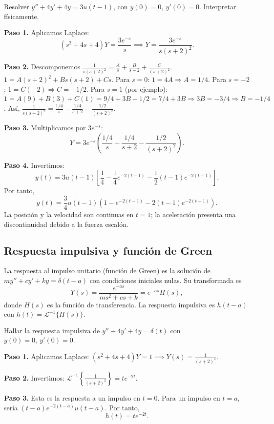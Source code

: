 \begin{example}
Resolver $y'' + 4y' + 4y = 3u(t-1)$, con $y(0)=0,\ y'(0)=0$. Interpretar físicamente.
\begin{myproof}
\textbf{Paso 1.} Aplicamos Laplace:
\[
(s^2+4s+4)Y = \frac{3e^{-s}}{s} \implies Y = \frac{3e^{-s}}{s(s+2)^2}.
\]

\textbf{Paso 2.} Descomponemos $\frac{1}{s(s+2)^2} = \frac{A}{s} + \frac{B}{s+2} + \frac{C}{(s+2)^2}$.
$1 = A(s+2)^2 + B s(s+2) + C s$.
Para $s=0$: $1 = 4A \Rightarrow A=1/4$.
Para $s=-2$: $1 = C(-2) \Rightarrow C=-1/2$.
Para $s=1$ (por ejemplo): $1 = A(9) + B(3) + C(1) = 9/4 + 3B - 1/2 = 7/4 + 3B \Rightarrow 3B = -3/4 \Rightarrow B=-1/4$.
Así, $\frac{1}{s(s+2)^2} = \frac{1/4}{s} - \frac{1/4}{s+2} - \frac{1/2}{(s+2)^2}$.

\textbf{Paso 3.} Multiplicamos por $3e^{-s}$:
\[
Y = 3e^{-s}\left( \frac{1/4}{s} - \frac{1/4}{s+2} - \frac{1/2}{(s+2)^2} \right).
\]

\textbf{Paso 4.} Invertimos:
\[
y(t) = 3u(t-1)\left[ \frac{1}{4} - \frac{1}{4}e^{-2(t-1)} - \frac{1}{2}(t-1)e^{-2(t-1)} \right].
\]
Por tanto,
\[
\boxed{y(t) = \frac{3}{4}u(t-1)\left( 1 - e^{-2(t-1)} - 2(t-1)e^{-2(t-1)} \right).}
\]
La posición y la velocidad son continuas en $t=1$; la aceleración presenta una discontinuidad debido a la fuerza escalón.
\end{myproof}
\end{example}

\subsection{Respuesta impulsiva y función de Green}

\begin{rem}
La respuesta al impulso unitario (función de Green) es la solución de $m y'' + c y' + k y = \delta(t-a)$ con condiciones iniciales nulas. Su transformada es
\[
Y(s) = \frac{e^{-as}}{m s^2 + c s + k} = e^{-as} H(s),
\]
donde $H(s)$ es la función de transferencia. La respuesta impulsiva es $h(t-a)$ con $h(t)=\mathcal{L}^{-1}\{H(s)\}$.
\end{rem}

\begin{example}
Hallar la respuesta impulsiva de $y'' + 4y' + 4y = \delta(t)$ con $y(0)=0,\ y'(0)=0$.
\begin{myproof}
\textbf{Paso 1.} Aplicamos Laplace: $(s^2+4s+4)Y = 1 \implies Y(s)=\frac{1}{(s+2)^2}$.

\textbf{Paso 2.} Invertimos: $\mathcal{L}^{-1}\left\{\frac{1}{(s+2)^2}\right\} = t e^{-2t}$.

\textbf{Paso 3.} Esta es la respuesta a un impulso en $t=0$. Para un impulso en $t=a$, sería $(t-a)e^{-2(t-a)}u(t-a)$.
Por tanto,
\[
\boxed{h(t) = t e^{-2t}.}
\]
\end{myproof}
\end{example}

